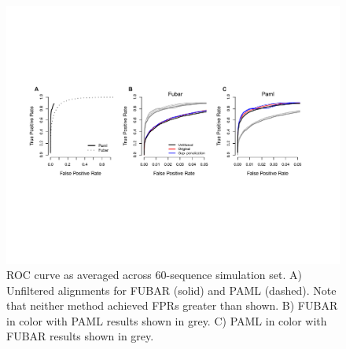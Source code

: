 \documentclass[10pt]{article}
\begin{document}
\begin{figure}[H]
\centerline{\includegraphics[width=7in]{Figures/roc.pdf}}
\caption{\label{roc} ROC curve as averaged across 60-sequence simulation set. A) Unfiltered alignments for FUBAR (solid) and PAML (dashed). Note that neither method achieved FPRs greater than shown. B) FUBAR in color with PAML results shown in grey. C) PAML in color with FUBAR results shown in grey.}
\end{figure}
\end{document}
